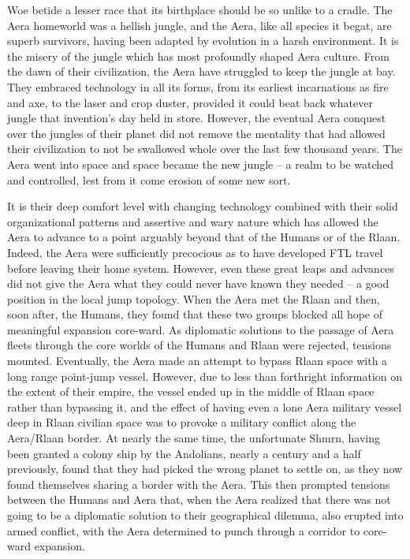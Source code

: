 Woe betide a lesser race that its birthplace should be so unlike to a cradle. The Aera homeworld was a hellish jungle, and the Aera, like all species it begat, are superb survivors, having been adapted by evolution in a harsh environment. It is the misery of the jungle which has most profoundly shaped Aera culture. From the dawn of their civilization, the Aera have struggled to keep the jungle at bay. They embraced technology in all its forms, from its earliest incarnations as fire and axe, to the laser and crop duster, provided it could beat back whatever jungle that invention’s day held in store. However, the eventual Aera conquest over the jungles of their planet did not remove the mentality that had allowed their civilization to not be swallowed whole over the last few thousand years. The Aera went into space and space became the new jungle – a realm to be watched and controlled, lest from it come erosion of some new sort.

It is their deep comfort level with changing technology combined with their solid organizational patterns and assertive and wary nature which has allowed the Aera to advance to a point arguably beyond that of the Humans or of the Rlaan. Indeed, the Aera were sufficiently precocious as to have developed FTL travel before leaving their home system. However, even these great leaps and advances did not give the Aera what they could never have known they needed – a good position in the local jump topology. When the Aera met the Rlaan and then, soon after, the Humans, they found that these two groups blocked all hope of meaningful expansion core-ward. As diplomatic solutions to the passage of Aera fleets through the core worlds of the Humans and Rlaan were rejected, tensions mounted. Eventually, the Aera made an attempt to bypass Rlaan space with a long range point-jump vessel. However, due to less than forthright information on the extent of their empire, the vessel ended up in the middle of Rlaan space rather than bypassing it, and the effect of having even a lone Aera military vessel deep in Rlaan civilian space was to provoke a military conflict along the Aera/Rlaan border. At nearly the same time, the unfortunate Shmrn, having been granted a colony ship by the Andolians, nearly a century and a half previously, found that they had picked the wrong planet to settle on, as they now found themselves sharing a border with the Aera. This then prompted tensions between the Humans and Aera that, when the Aera realized that there was not going to be a diplomatic solution to their geographical dilemma, also erupted into armed conflict, with the Aera determined to punch through a corridor to core-ward expansion.

